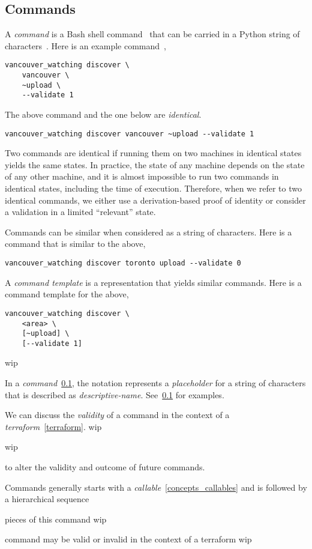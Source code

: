 \subsection{Commands}
\label{commands}

A \emph{command} is a Bash shell command~ that can be carried in a Python string of characters~. Here is an example command~\cite{vanwatch},

\begin{verbatim}
vancouver_watching discover \
    vancouver \
    ~upload \
    --validate 1
\end{verbatim}

The above command and the one below are \emph{identical}.
%
\begin{verbatim}
vancouver_watching discover vancouver ~upload --validate 1
\end{verbatim}
%
Two commands are identical if running them on two machines in identical states yields the same states. In practice, the state of any machine depends on the state of any other machine, and it is almost impossible to run two commands in identical states, including the time of execution. Therefore, when we refer to two identical commands, we either use a derivation-based proof of identity or consider a validation in a limited ``relevant'' state.
 
Commands can be similar when considered as a string of characters. Here is a command that is similar to the above,
%
\begin{verbatim}
vancouver_watching discover toronto upload --validate 0
\end{verbatim}

A \emph{command template} is a representation that yields similar commands. Here is a command template for the above,

\begin{verbatim}
vancouver_watching discover \
    <area> \
    [~upload] \
    [--validate 1]
\end{verbatim}

wip

In a \emph{command}~\ref{commands}, the notation  represents a \emph{placeholder} for a string of characters that is described as \emph{descriptive-name}. See~\ref{commands} for examples.




We can discuss the \emph{validity} of a command in the context of a \emph{terraform}~\ref{terraform}. wip

wip

 to alter the validity and outcome of future commands.

Commands generally starts with a \emph{callable}~\ref{concepts_callables} and is followed by a hierarchical sequence 

pieces of this command wip

command may be valid or invalid in the context of a terraform wip

